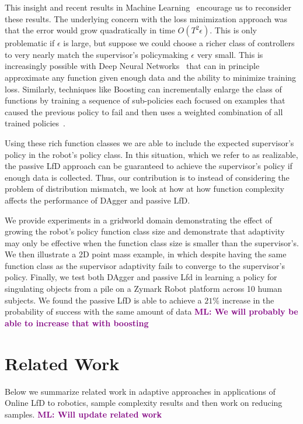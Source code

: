 \documentclass[10pt, conference]{ieeeconf}      %
\newcommand{\mlnote}[1]{\ifthenelse{ \boolean{include-notes}}%
 {\textcolor{purple}{\textbf{ML: #1}}}{}}
\begin{document}
This insight and recent results in Machine Learning~\cite{krizhevsky2012imagenet} encourage us to reconsider these results. The underlying concern with the loss minimization approach was that the error would grow quadratically in time $O(T^2\epsilon)$. This is only problematic if $\epsilon$ is large, but suppose we could choose a richer class of controllers to very nearly match the supervisor’s policymaking $\epsilon$ very small. This is increasingly possible with Deep Neural Networks~\cite{anthony2009neural} that can in principle approximate any function given enough data and the ability to minimize training loss. Similarly, techniques like Boosting can incrementally enlarge the class of functions by training a sequence of sub-policies each focused on examples that caused the previous policy to fail and then uses a weighted combination of all trained policies~\cite{mason1999boosting}.

Using these rich function classes we are able to include the expected supervisor's policy in the robot's policy class. In this situation, which we refer to as realizable, the passive LfD approach can be guaranteed to achieve the supervisor's policy if enough data is collected. Thus, our contribution is to instead of considering the problem of distribution mismatch, we look at how at how function complexity affects the performance of DAgger and passive LfD. 


We  provide experiments in a gridworld domain demonstrating the effect of growing the robot's policy function class size and demonstrate that adaptivity may only be effective when the function class size is smaller than the supervisor's. We then illustrate a 2D point mass example, in which despite having the same function class as the supervisor adaptivity fails to converge to the supervisor's policy. Finally, we test both DAgger and passive Lfd in learning a policy for singulating objects from a pile on a Zymark Robot platform across 10 human subjects. We found the passive LfD is able to achieve a $21 \%$ increase in the probability of success with the same amount of data \mlnote{We will probably be able to increase that with boosting}


\section{Related Work}
Below we summarize related work in adaptive approaches in applications of Online LfD to robotics, sample complexity results and then work on reducing samples. \mlnote{Will update related work}
\end{document}

